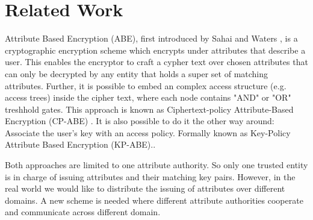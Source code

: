 \documentclass[twocolumn]{article}
\begin{document}



\section{Related Work}

Attribute Based Encryption (ABE), first introduced by Sahai and Waters \cite{sahai2005fuzzy}, is a cryptographic encryption scheme which encrypts under attributes that describe a user. This enables the encryptor to craft a cypher text over chosen attributes that can only be decrypted by any entity that holds a super set of matching attributes. Further, it is possible to embed an complex access structure (e.g. access trees) inside the cipher text, where each node contains "AND" or "OR" treshhold gates. This approach is known as Ciphertext-policy Attribute-Based Encryption (CP-ABE) \cite{bethencourt2007ciphertext}. 
It is also possible to do it the other way around: Associate the user's key with an access policy. Formally known as Key-Policy Attribute Based Encryption (KP-ABE).\cite{goyal2006attribute}. 

Both approaches are limited to one attribute authority. So only one trusted entity is in charge of issuing attributes and their matching key pairs. However, in the real world we would like to distribute the issuing of attributes over different domains. A new scheme is needed where different attribute authorities cooperate and communicate across different domain.  

\end{document}
